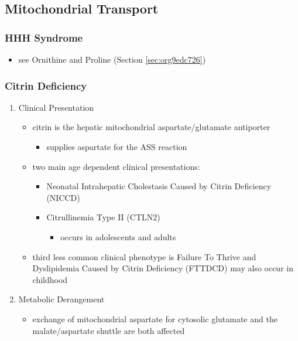 \documentclass[12pt]{scrartcl}
\begin{document}
\begin{center}
\begin{center}
\subsection{Mitochondrial Transport}
\label{sec:orgbcbe985}
\subsubsection{HHH Syndrome}
\label{sec:org32daf66}
\begin{itemize}
\item see Ornithine and Proline (Section \ref{sec:org9edc726})
\end{itemize}
\subsubsection{Citrin Deficiency}
\label{sec:orgb64c66b}
\begin{enumerate}
\item Clinical Presentation
\label{sec:orgc631de1}
\begin{itemize}
\item citrin is the hepatic mitochondrial aspartate/glutamate antiporter
\begin{itemize}
\item supplies aspartate for the ASS reaction
\end{itemize}
\item two main age dependent clinical presentations:
\begin{itemize}
\item Neonatal Intrahepatic Cholestasis Caused by Citrin Deficiency (NICCD)
\item Citrullinemia Type II (CTLN2)
\begin{itemize}
\item occurs in adolescents and adults
\end{itemize}
\end{itemize}
\item third less common clinical phenotype is Failure To Thrive and
Dyslipidemia Caused by Citrin Deficiency (FTTDCD) may also occur in
childhood
\end{itemize}

\item Metabolic Derangement
\label{sec:orgd5ac784}
\begin{itemize}
\item exchange of mitochondrial aspartate for cytosolic glutamate and
the malate/aspartate shuttle are both affected
\end{itemize}


\end{enumerate}
\end{center}
\end{center}
\end{document}
